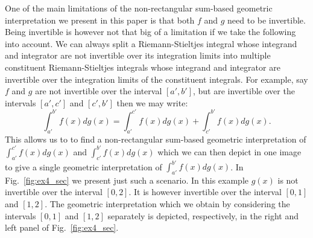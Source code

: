 \documentclass{article}
\theoremstyle{theorem}
\theoremstyle{definition}
\begin{document}
\noindent
One of the main limitations of the non-rectangular sum-based geometric interpretation we present in this paper is that both $f$ and $g$ need to be invertible.
Being invertible is however not that big of a limitation if we take the following into account. We can always split a Riemann-Stieltjes
integral whose integrand and integrator are not invertible over its integration limits into multiple constituent Riemann-Stieltjes integrals whose 
integrand and integrator are invertible over the integration limits of the constituent integrals. For example, say 
$f$ and $g$ are not invertible over the interval $[a',b']$, but are invertible over the intervals $[a',c']$ and 
$[c',b']$ then we may write:
\begin{equation}
\int_{a'}^{b'}f(x)dg(x) = \int_{a'}^{c'}f(x)dg(x) + \int_{c'}^{b'} f(x)dg(x).
\end{equation}
This allows us to to find a non-rectangular sum-based geometric interpretation of $\int_{a'}^{c'}f(x)dg(x)$ and $\int_{c'}^{b'} f(x)dg(x)$
which we can then depict in one image to give a single geometric interpretation of $\int_{a'}^{b'}f(x)dg(x)$.
In Fig.~\ref{fig:ex4_sec} we present just such a scenario. In this example $g(x)$ is not invertible over the interval 
$[0,2]$. It is however invertible over the interval $[0,1]$ and $[1,2]$. The geometric interpretation which we 
obtain by considering the intervals $[0,1]$ and $[1,2]$ separately is depicted, respectively, in the 
right and left panel of Fig.~\ref{fig:ex4_sec}.

\end{document}
